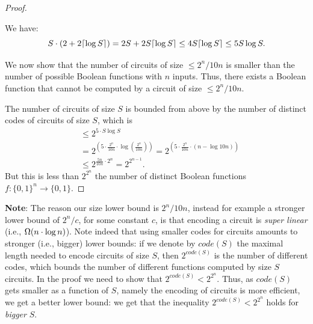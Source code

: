\begin{proof}
\begin{proofclaim}
We have:
$$
S \cdot(2+2 \lceil \log S \rceil) = 
2S +2S \lceil \log S \rceil \leq  4 S {\lceil{\log S}\rceil}\le 5S\log S.$$
\end{proofclaim}

We now show that the number of circuits of size $\leq 2^n / 10 n$ is smaller than the number of possible Boolean functions with $n$ inputs.
Thus,  there exists a Boolean function that cannot be computed by a circuit of size $\leq 2^n / 10 n$.

The number of circuits of size $S$ is bounded from above by the number of distinct codes of circuits of size $S$, which is
$$
\begin{aligned}
& \leq 2^{5 \cdot S \log S} \\
& =2^{\left(5 \cdot \frac{2^{n}}{10n} \cdot \log \left(\frac{2^n}{10n}\right)\right)}=
2^{\left(5 \cdot \frac{2^n}{10 n} \cdot(n-\log 10 n)\right)} \\
& \leq 2^{\frac{5 n}{10 n} \cdot 2^n}=2^{2^{n-1}} . 
\end{aligned}
$$
But this is 
less than $2^{2^n}$ the number of distinct Boolean functions $f:\{0,1\}^n\to\{0,1\}$. 
\end{proof}

\noindent \textbf{Note}:  The reason our size lower bound is $2^n/10n$, instead for example a stronger lower bound of $2^n/c$, for some constant $c$, is that encoding a circuit is \emph{super linear} (i.e., $\Omega (n\cdot\log n)$). 
Note indeed that using smaller codes for circuits amounts to stronger (i.e., bigger) lower bounds:  if we denote by $code(S)$ the maximal length needed to encode circuits of size $S$, then $2^{code(S)}$ is the number of different codes, which bounds the number of different functions computed by size $S$ circuits. In the proof we need to show that $2^{code(S)}<2^{2^n}$. Thus, as $code(S)$ gets smaller as a function of $S$, namely the encoding of circuits is more efficient, we get a better lower bound: we get that the inequality $2^{code(S)}<2^{2^n}$ holds for \emph{bigger} $S$.  


 



